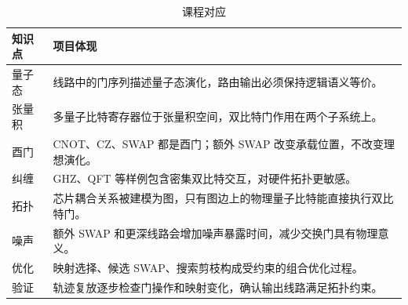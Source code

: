 \begin{table}[H]
  \centering
  \caption{课程对应}
  \label{tab:concept-mapping}
  \begin{tabularx}{\linewidth}{lY}
    \toprule
    知识点 & 项目体现 \\
    \midrule
    量子态 & 线路中的门序列描述量子态演化，路由输出必须保持逻辑语义等价。\\
    张量积 & 多量子比特寄存器位于张量积空间，双比特门作用在两个子系统上。\\
    酉门 & CNOT、CZ、SWAP 都是酉门；额外 SWAP 改变承载位置，不改变理想演化。\\
    纠缠 & GHZ、QFT 等样例包含密集双比特交互，对硬件拓扑更敏感。\\
    拓扑 & 芯片耦合关系被建模为图，只有图边上的物理量子比特能直接执行双比特门。\\
    噪声 & 额外 SWAP 和更深线路会增加噪声暴露时间，减少交换门具有物理意义。\\
    优化 & 映射选择、候选 SWAP、搜索剪枝构成受约束的组合优化过程。\\
    验证 & 轨迹复放逐步检查门操作和映射变化，确认输出线路满足拓扑约束。\\
    \bottomrule
  \end{tabularx}
\end{table}
